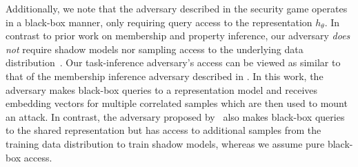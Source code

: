 Additionally, we note that the adversary described in the security game operates in a black-box manner, only requiring query access to the representation $h_\theta$. In contrast to prior work on membership and property inference, our adversary \emph{does not} require shadow models nor sampling access to the underlying data distribution~\cite{carlini-2022-lira, mahloujifar2022propertypoisoning,shokri-2016-mi, liu2021encodermi, abascal2023tmi}. Our task-inference adversary's access can be viewed as similar to that of the membership inference adversary described in \cite{liu2021encodermi}. In this work, the adversary makes black-box queries to a representation model and receives embedding vectors for multiple correlated samples which are then used to mount an attack. In contrast, the adversary proposed by~\citet{liu2021encodermi} also makes black-box queries to the shared representation but has access to additional samples from the training data distribution to train shadow models, whereas we assume pure black-box access.